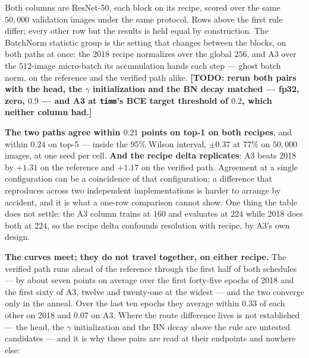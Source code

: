 \noindent Both columns are ResNet-50, each block on its recipe, scored over
the same $50{,}000$ validation images under the same protocol. Rows above
the first rule differ; every other row but the results is held equal by
construction. The BatchNorm statistic group is the setting that changes
between the blocks, on both paths at once: the 2018 recipe normalizes over
the global $256$, and A3 over the $512$-image micro-batch its accumulation
hands each step --- ghost batch norm, on the reference and the verified
path alike. \textbf{[TODO: rerun both pairs with the head, the $\gamma$
initialization and the BN decay matched --- fp32, zero, $0.9$ --- and A3 at
\texttt{timm}'s BCE target threshold of $0.2$, which neither column had.]}

\medskip\noindent\textbf{The two paths agree within $0.21$ points on top-1
on both recipes}, and within $0.24$ on top-5 --- inside the 95\% Wilson interval, $\pm0.37$ at $77\%$ on $50{,}000$ images, at one seed per cell. \textbf{And the recipe delta replicates}: A3 beats 2018 by
$+1.31$ on the reference and $+1.17$ on the verified path. Agreement at a
single configuration can be a coincidence of that configuration; a
difference that reproduces across two independent implementations is harder
to arrange by accident, and it is what a one-row comparison cannot show. One
thing the table does not settle: the A3 column trains at $160$ and evaluates
at $224$ while 2018 does both at $224$, so the recipe delta confounds
resolution with recipe, by A3's own design.

\medskip\noindent\textbf{The curves meet; they do not travel together, on
either recipe.} The verified path runs ahead of the reference through the
first half of both schedules --- by about seven points on average over the
first forty-five epochs of 2018 and the first sixty of A3, twelve and
twenty-one at the widest --- and the two converge only in the anneal. Over
the last ten epochs they average within $0.33$ of each other on 2018 and
$0.07$ on A3. Where the route difference lives is not established --- the
head, the $\gamma$ initialization and the BN decay above the rule are
untested candidates --- and it is why these pairs are read at their
endpoints and nowhere else:

